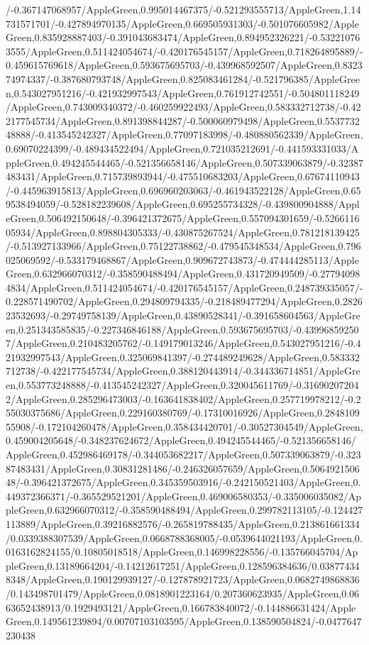 {\begin{tikzternal}
/-0.367147068957/AppleGreen,0.995014467375/-0.521293555713/AppleGreen,1.14731571701/-0.427894970135/AppleGreen,0.669505931303/-0.501076605982/AppleGreen,0.835928887403/-0.391043683474/AppleGreen,0.894952326221/-0.532210763555/AppleGreen,0.511424054674/-0.420176545157/AppleGreen,0.718264895889/-0.459615769618/AppleGreen,0.593675695703/-0.439968592507/AppleGreen,0.832374974337/-0.387680793748/AppleGreen,0.825083461284/-0.521796385/AppleGreen,0.543027951216/-0.421932997543/AppleGreen,0.761912742551/-0.504801118249/AppleGreen,0.743009340372/-0.460259922493/AppleGreen,0.583332712738/-0.422177545734/AppleGreen,0.891398844287/-0.500060979498/AppleGreen,0.553773248888/-0.413545242327/AppleGreen,0.77097183998/-0.480880562339/AppleGreen,0.69070224399/-0.489434522494/AppleGreen,0.721035212691/-0.441593331033/AppleGreen,0.494245544465/-0.521356658146/AppleGreen,0.507339063879/-0.32387483431/AppleGreen,0.715739893944/-0.475510683203/AppleGreen,0.67674110943/-0.445963915813/AppleGreen,0.696960203063/-0.461943522128/AppleGreen,0.659538494059/-0.528182239608/AppleGreen,0.695255734328/-0.439800904888/AppleGreen,0.506492150648/-0.396421372675/AppleGreen,0.557094301659/-0.526611605934/AppleGreen,0.898804305333/-0.430875267524/AppleGreen,0.781218139425/-0.513927133966/AppleGreen,0.75122738862/-0.479545348534/AppleGreen,0.796025069592/-0.533179468867/AppleGreen,0.909672743873/-0.474444285113/AppleGreen,0.632966070312/-0.358590488494/AppleGreen,0.431720949509/-0.277940984834/AppleGreen,0.511424054674/-0.420176545157/AppleGreen,0.248739335057/-0.228571490702/AppleGreen,0.294809794335/-0.218489477294/AppleGreen,0.282623532693/-0.29749758139/AppleGreen,0.43890528341/-0.391658604563/AppleGreen,0.251343585835/-0.227346846188/AppleGreen,0.593675695703/-0.439968592507/AppleGreen,0.210483205762/-0.149179013246/AppleGreen,0.543027951216/-0.421932997543/AppleGreen,0.325069841397/-0.274489249628/AppleGreen,0.583332712738/-0.422177545734/AppleGreen,0.388120443914/-0.344336714851/AppleGreen,0.553773248888/-0.413545242327/AppleGreen,0.320045611769/-0.316902072042/AppleGreen,0.285296473003/-0.163641838402/AppleGreen,0.257719978212/-0.255030375686/AppleGreen,0.229160380769/-0.17310016926/AppleGreen,0.284810955908/-0.172104260478/AppleGreen,0.358434420701/-0.30527304549/AppleGreen,0.459004205648/-0.348237624672/AppleGreen,0.494245544465/-0.521356658146/AppleGreen,0.452986469178/-0.344053682217/AppleGreen,0.507339063879/-0.32387483431/AppleGreen,0.30831281486/-0.246326057659/AppleGreen,0.506492150648/-0.396421372675/AppleGreen,0.345359503916/-0.242150521403/AppleGreen,0.449372366371/-0.365529521201/AppleGreen,0.469006580353/-0.335006035082/AppleGreen,0.632966070312/-0.358590488494/AppleGreen,0.299782113105/-0.124427113889/AppleGreen,0.39216882576/-0.265819788435/AppleGreen,0.213861661334/0.0339388307539/AppleGreen,0.0668788368005/-0.0539644021193/AppleGreen,0.0163162824155/0.10805018518/AppleGreen,0.146998228556/-0.135766045704/AppleGreen,0.13189664204/-0.14212617251/AppleGreen,0.128596384636/0.038774348348/AppleGreen,0.190129939127/-0.127878921723/AppleGreen,0.0682749868836/0.143498701479/AppleGreen,0.0818901223164/0.207360623935/AppleGreen,0.0663652438913/0.1929493121/AppleGreen,0.166783840072/-0.144886631424/AppleGreen,0.149561239894/0.00707103103595/AppleGreen,0.138590504824/-0.0477647230438
\end{tikzternal}}
